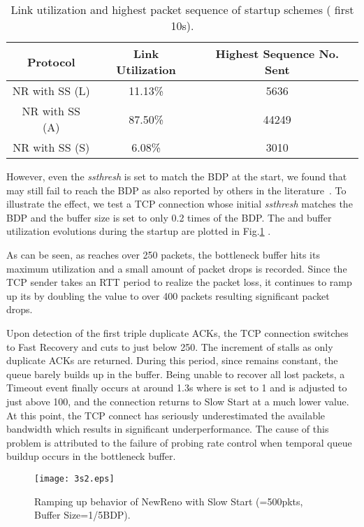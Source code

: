 \documentclass[12pt,onecolumn]{IEEEtran}
\begin{document}
\begin{table}
\centering
\caption{\footnotesize Link utilization and highest packet
sequence of startup schemes  ( first 10s).}
\begin{tabular}{|c|c|c|} \hline
Protocol& Link Utilization & Highest Sequence No. Sent\\ \hline \hline
NR with SS (L) & 11.13\%   &   5636\\ \hline NR with SS (A) & 87.50\%   & 44249 \\ \hline
NR with SS (S) & 6.08\%   &   3010\\ \hline
\end{tabular}
\label{table1}
\end{table}


However, even the \emph{ssthresh} is set to match the BDP at the start, we
found that  may still fail to reach the BDP as also reported by others in
the literature~\cite{short}. To illustrate the effect, we test a TCP connection
whose initial \emph{ssthresh} matches the BDP and the buffer size is set to
only 0.2 times of the BDP. The  and buffer utilization evolutions during
the startup are plotted in Fig.\ref{3s} .

As can be seen, as  reaches over 250 packets, the bottleneck buffer hits
its maximum utilization and a small amount of packet drops is recorded. Since
the TCP sender takes an RTT period to realize the packet loss, it continues to
ramp up its  by doubling the value to over 400 packets resulting
significant packet drops.

Upon detection of the first triple duplicate ACKs, the TCP connection switches
to Fast Recovery and cuts  to just below 250. The increment of 
stalls as only duplicate ACKs are returned. During this period, since 
remains constant, the queue barely builds up in the buffer. Being unable to
recover all lost packets, a Timeout event finally occurs at around 1.3s where
 is set to 1 and  is adjusted to just above 100, and the
connection returns to Slow Start at a much lower  value. At this
point, the TCP connect has seriously underestimated the available bandwidth
which results in significant underperformance. The cause of this problem is
attributed to the failure of probing rate control when temporal queue buildup
occurs in the bottleneck buffer.

\begin{figure}
\centering
\texttt{[image: 3s2.eps]}
\caption{Ramping up behavior of NewReno with Slow Start (=500pkts, Buffer Size=1/5BDP).} \label{3s}
\end{figure}
\end{document}
